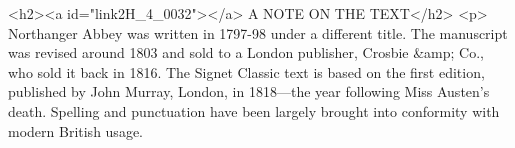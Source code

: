 <h2><a id="link2H_4_0032"></a> A NOTE ON THE TEXT</h2>
<p>
Northanger Abbey was written in 1797-98 under a different title. The manuscript
was revised around 1803 and sold to a London publisher, Crosbie &amp; Co., who
sold it back in 1816. The Signet Classic text is based on the first edition,
published by John Murray, London, in 1818—the year following Miss
Austen's death. Spelling and punctuation have been largely brought into
conformity with modern British usage.
